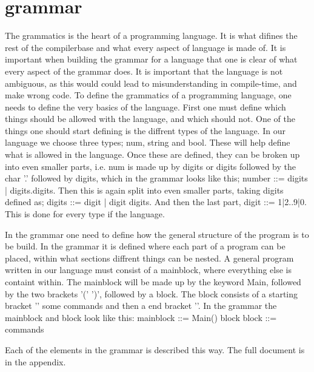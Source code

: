 \section{grammar}
The grammatics is the heart of a programming language. It is what difines the rest of the compilerbase and what every aspect of language is made of.
It is important when building the grammar for a language that one is clear of what every aspect of the grammar does. It is important that the language is not ambiguous, as this would could lead to misunderstanding in compile-time, and make wrong code.
To define the grammatics of a programming language, one needs to define the very basics of the language. First one must define which things should be allowed with the language, and which should not.
One of the things one should start defining is the diffrent types of the language. In our language we choose three types; num, string and bool. These will help define what is allowed in the language. Once these are defined, they can be broken up into even smaller parts, i.e. num is made up by digits or digits followed by the char '.' followed by digits, which in the grammar looks like this; number ::= digits | digits.digits.
Then this is again split into even smaller parts, taking digits defined as; digits ::= digit | digit digits. And then the last part, digit ::= 1|2..9|0. This is done for every type if the language.

In the grammar one need to define how the general structure of the program is to be build. In the grammar it is defined where each part of a program can be placed, within what sections diffrent things can be nested. A general program written in our language must consist of a mainblock, where everything else is containt within. The mainblock will be made up by the keyword Main, followed by the two brackets '(' ')', followed by a block.
The block consists of a starting bracket '{' some commands and then a end bracket '}'. In the grammar the mainblock and block look like this: mainblock ::= Main() block
block ::= { commands }

Each of the elements in the grammar is described this way. The full document is in the appendix.